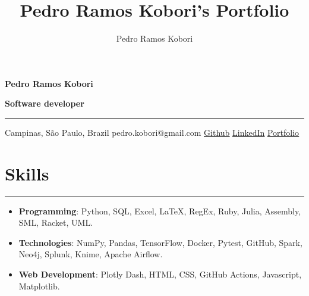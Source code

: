 \documentclass[a4paper,10pt]{article}
\title{Pedro Ramos Kobori's Portfolio}
\newcommand{\ulink}[2]{\href{#1}{\underline{#2}}}
\begin{document}
\date{}
\author{Pedro Ramos Kobori}

\noindent
\begin{minipage}[t]{0.5\textwidth}
  \begin{flushleft}
    \textbf{\Large Pedro Ramos Kobori}
  \end{flushleft}
\end{minipage}
\begin{minipage}[t]{0.5\textwidth}
  \begin{flushright}
    \textbf{\Large Software developer}
  \end{flushright}
\end{minipage}

\hrule

\vspace{2mm}
\noindent
{
  \centering
  Campinas, São Paulo, Brazil \textbar{}
  pedro.kobori@gmail.com \textbar{}
  \ulink{https://github.com/rokobo}{Github} \textbar{}
  \ulink{https://www.linkedin.com/in/pedrokobori/}{LinkedIn} \textbar{}
  \ulink{https://rokobo.github.io}{Portfolio}
  \par
}

\section*{Skills}
\hrule
\vspace{2mm}
\begin{itemize}[itemsep=0pt]
  \item \textbf{Programming}: Python, SQL, Excel, LaTeX, RegEx, Ruby, Julia, Assembly, SML, Racket, UML.
  \item \textbf{Technologies}: NumPy, Pandas, TensorFlow, Docker, Pytest, GitHub, Spark, Neo4j, Splunk, Knime, Apache Airflow.
  \item \textbf{Web Development}: Plotly Dash, HTML, CSS, GitHub Actions, Javascript, Matplotlib.
\end{itemize}
\end{document}
